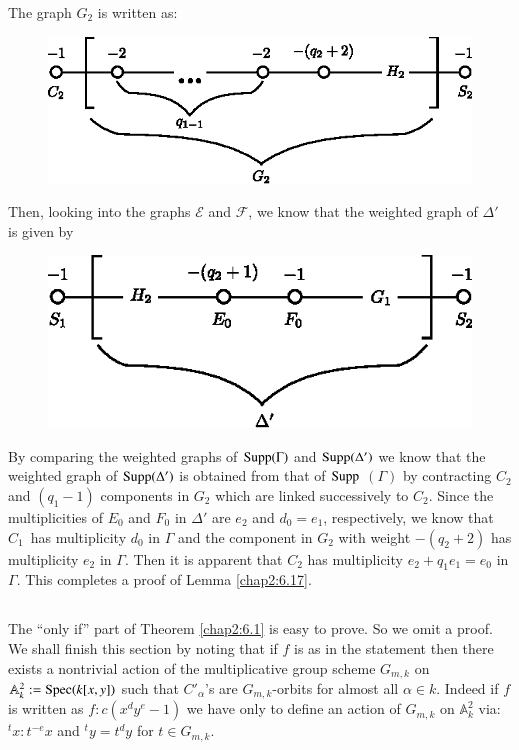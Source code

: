 \subsubsection{}\label{chap2:6.17.4}
The graph $G_{2}$ is written as:
\begin{figure}[H]
\centering
\includegraphics{figures/chap2-fig42.eps}
\end{figure}
Then, looking into the graphs $\mathscr{E}$ and $\mathscr{F}$, we know
that the weighted graph of $\Delta'$ is given by
\begin{figure}[H]
\centering
\includegraphics{figures/chap2-fig43.eps}
\end{figure}%
By comparing the weighted graphs of $\operatorname{Supp}(\Gamma)$ and
$\operatorname{Supp}(\Delta')$ we know that the weighted graph of $\operatorname{Supp}(\Delta')$
is obtained from that of $\operatorname{Supp}$ $(\Gamma)$ by contracting $C_{2}$ and
$(q_{1}-1)$ components in $G_{2}$ which are linked successively to
$C_{2}$. Since the multiplicities of $E_{0}$ and $F_{0}$ in $\Delta'$
are $e_{2}$ and $d_{0}=e_{1}$, respectively, we know that
$C_{1}$\pageoriginale\ has multiplicity $d_{0}$ in $\Gamma$ and the
component in $G_{2}$ with weight $-(q_{2}+2)$ has multiplicity $e_{2}$
in $\Gamma$. Then it is apparent that $C_{2}$ has multiplicity
$e_{2}+q_{1}e_{1}=e_{0}$ in $\Gamma$. This completes a proof of Lemma
\ref{chap2:6.17}. 

\subsection{}\label{chap2:6.18}
The ``only if'' part of Theorem \ref{chap2:6.1} is easy to prove. So we
omit a proof. We shall finish this section by noting that if $f$ is as
in the statement then there exists a nontrivial action of the
multiplicative group scheme $G_{m,k}$ on
$\mathbb{A}^{2}_{k}:=\operatorname{Spec}(k[x,y])$ such that $C'_{\alpha}$'s are
$G_{m,k}$-orbits for almost all $\alpha\in k$. Indeed if $f$ is
written as $f:c(x^{d}y^{e}-1)$ we have only to define an action of
$G_{m,k}$ on $\mathbb{A}^{2}_{k}$ via: ${}^{t}x:t^{-e}x$ and
${}^{t}y=t^{d}y$ for $t\in G_{m,k}$.
